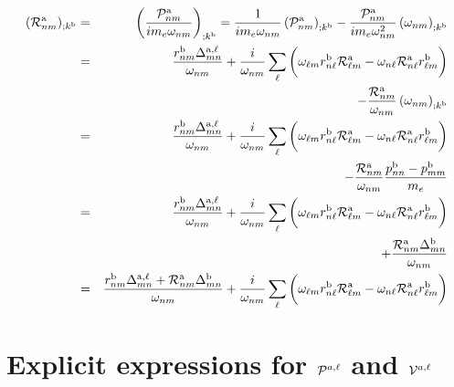 \documentclass[floatfix,prb,aps,superscriptaddress,11pt,preprint]{revtex4}
\begin{document}
\begin{eqnarray}\label{a_rgendevnnn}
({\cal R}^{\mathrm{a}}_{nm})_{;k^{\mathrm{b}}}&=&\left(\frac{{\cal P}^{\mathrm{a}}_{nm}}{im_e\omega_{nm}}\right)_{;k^{\mathrm{b}}}
=
\frac{1}
{im_e\omega_{nm}}
\left(
{\cal P}^{\mathrm{a}}_{nm}
\right)_{;k^{\mathrm{b}}}
-
\frac{{\cal P}^{\mathrm{a}}_{nm}}
{im_e\omega^2_{nm}}
\left(
\omega_{nm}
\right)_{;k^{\mathrm{b}}}
\nonumber \\
&=&
\frac{r^{\mathrm{b}}_{nm}
\Delta^{\mathrm{a},\ell}_{mn}}
{\omega_{nm}}
+
\frac{i}{\omega_{nm}}
\sum_{\ell}
\bigg(
\omega_{\ell m}
r^{\mathrm{b}}_{n\ell}
{\cal R}^{\mathrm{a}}_{\ell m}
-
\omega_{n\ell}
{\cal R}^{\mathrm{a}}_{n\ell}
r^{\mathrm{b}}_{\ell m}
\bigg)
\nonumber \\
&&
-
\frac{{\cal R}^{\mathrm{a}}_{nm}}
{\omega_{nm}}
\left(
\omega_{nm}
\right)_{;k^{\mathrm{b}}}
\nonumber \\
&=&
\frac{r^{\mathrm{b}}_{nm}
\Delta^{\mathrm{a},\ell}_{mn}}
{\omega_{nm}}
+
\frac{i}{\omega_{nm}}
\sum_{\ell}
\bigg(
\omega_{\ell m}
r^{\mathrm{b}}_{n\ell}
{\cal R}^{\mathrm{a}}_{\ell m}
-
\omega_{n\ell}
{\cal R}^{\mathrm{a}}_{n\ell}
r^{\mathrm{b}}_{\ell m}
\bigg)
\nonumber \\
&&
-
\frac{{\cal R}^{\mathrm{a}}_{nm}}
{\omega_{nm}}
\frac{p^{\mathrm{b}}_{nn}-p^{\mathrm{b}}_{mm}}{m_e}
\nonumber \\
&=&
\frac{r^{\mathrm{b}}_{nm}
\Delta^{\mathrm{a},\ell}_{mn}}
{\omega_{nm}}
+
\frac{i}{\omega_{nm}}
\sum_{\ell}
\bigg(
\omega_{\ell m}
r^{\mathrm{b}}_{n\ell}
{\cal R}^{\mathrm{a}}_{\ell m}
-
\omega_{n\ell}
{\cal R}^{\mathrm{a}}_{n\ell}
r^{\mathrm{b}}_{\ell m}
\bigg)
\nonumber \\
&&
+
\frac{
{\cal R}^{\mathrm{a}}_{nm}\Delta^{\mathrm{b}}_{mn}
}
{\omega_{nm}}
\nonumber \\
&=&
\frac{r^{\mathrm{b}}_{nm}
\Delta^{\mathrm{a},\ell}_{mn}
+
{\cal R}^{\mathrm{a}}_{nm}\Delta^{\mathrm{b}}_{mn}
}
{\omega_{nm}}
+
\frac{i}{\omega_{nm}}
\sum_{\ell}
\bigg(
\omega_{\ell m}
r^{\mathrm{b}}_{n\ell}
{\cal R}^{\mathrm{a}}_{\ell m}
-
\omega_{n\ell}
{\cal R}^{\mathrm{a}}_{n\ell}
r^{\mathrm{b}}_{\ell m}
\bigg)
\end{eqnarray}

\section{Explicit expressions for ${\cal P}^{a,\ell}$
and ${\cal V}^{a,\ell}$
}\label{pw}%
\end{document}
